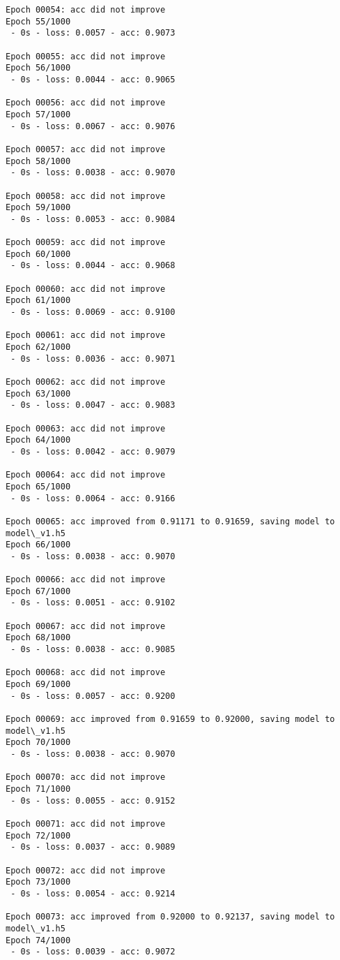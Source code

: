 \documentclass[11pt]{article}
\begin{document}
\begin{Verbatim}[commandchars=\\\{\}]
Epoch 00054: acc did not improve
Epoch 55/1000
 - 0s - loss: 0.0057 - acc: 0.9073

Epoch 00055: acc did not improve
Epoch 56/1000
 - 0s - loss: 0.0044 - acc: 0.9065

Epoch 00056: acc did not improve
Epoch 57/1000
 - 0s - loss: 0.0067 - acc: 0.9076

Epoch 00057: acc did not improve
Epoch 58/1000
 - 0s - loss: 0.0038 - acc: 0.9070

Epoch 00058: acc did not improve
Epoch 59/1000
 - 0s - loss: 0.0053 - acc: 0.9084

Epoch 00059: acc did not improve
Epoch 60/1000
 - 0s - loss: 0.0044 - acc: 0.9068

Epoch 00060: acc did not improve
Epoch 61/1000
 - 0s - loss: 0.0069 - acc: 0.9100

Epoch 00061: acc did not improve
Epoch 62/1000
 - 0s - loss: 0.0036 - acc: 0.9071

Epoch 00062: acc did not improve
Epoch 63/1000
 - 0s - loss: 0.0047 - acc: 0.9083

Epoch 00063: acc did not improve
Epoch 64/1000
 - 0s - loss: 0.0042 - acc: 0.9079

Epoch 00064: acc did not improve
Epoch 65/1000
 - 0s - loss: 0.0064 - acc: 0.9166

Epoch 00065: acc improved from 0.91171 to 0.91659, saving model to model\_v1.h5
Epoch 66/1000
 - 0s - loss: 0.0038 - acc: 0.9070

Epoch 00066: acc did not improve
Epoch 67/1000
 - 0s - loss: 0.0051 - acc: 0.9102

Epoch 00067: acc did not improve
Epoch 68/1000
 - 0s - loss: 0.0038 - acc: 0.9085

Epoch 00068: acc did not improve
Epoch 69/1000
 - 0s - loss: 0.0057 - acc: 0.9200

Epoch 00069: acc improved from 0.91659 to 0.92000, saving model to model\_v1.h5
Epoch 70/1000
 - 0s - loss: 0.0038 - acc: 0.9070

Epoch 00070: acc did not improve
Epoch 71/1000
 - 0s - loss: 0.0055 - acc: 0.9152

Epoch 00071: acc did not improve
Epoch 72/1000
 - 0s - loss: 0.0037 - acc: 0.9089

Epoch 00072: acc did not improve
Epoch 73/1000
 - 0s - loss: 0.0054 - acc: 0.9214

Epoch 00073: acc improved from 0.92000 to 0.92137, saving model to model\_v1.h5
Epoch 74/1000
 - 0s - loss: 0.0039 - acc: 0.9072


\end{Verbatim}
\end{document}
